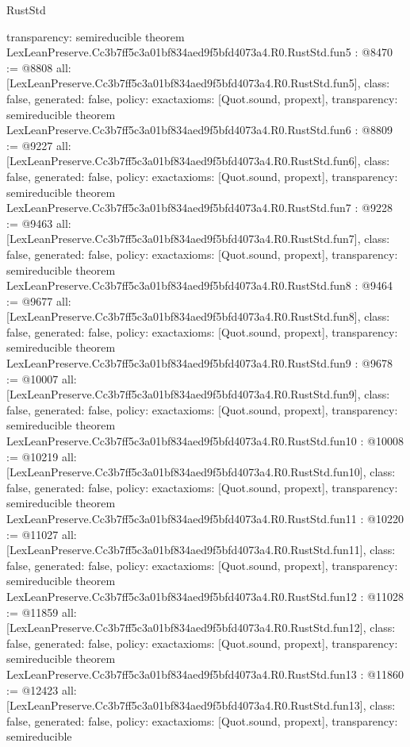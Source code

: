 \begin{lexlean}{RustStd}
\begin{coremodule}
{  transparency: semireducible
}
theorem LexLeanPreserve.Cc3b7ff5c3a01bf834aed9f5bfd4073a4.R0.RustStd.fun5 : @8470 := @8808 {
  all: [LexLeanPreserve.Cc3b7ff5c3a01bf834aed9f5bfd4073a4.R0.RustStd.fun5],
  class: false,
  generated: false,
  policy: exact{axioms: [Quot.sound, propext]},
  transparency: semireducible
}
theorem LexLeanPreserve.Cc3b7ff5c3a01bf834aed9f5bfd4073a4.R0.RustStd.fun6 : @8809 := @9227 {
  all: [LexLeanPreserve.Cc3b7ff5c3a01bf834aed9f5bfd4073a4.R0.RustStd.fun6],
  class: false,
  generated: false,
  policy: exact{axioms: [Quot.sound, propext]},
  transparency: semireducible
}
theorem LexLeanPreserve.Cc3b7ff5c3a01bf834aed9f5bfd4073a4.R0.RustStd.fun7 : @9228 := @9463 {
  all: [LexLeanPreserve.Cc3b7ff5c3a01bf834aed9f5bfd4073a4.R0.RustStd.fun7],
  class: false,
  generated: false,
  policy: exact{axioms: [Quot.sound, propext]},
  transparency: semireducible
}
theorem LexLeanPreserve.Cc3b7ff5c3a01bf834aed9f5bfd4073a4.R0.RustStd.fun8 : @9464 := @9677 {
  all: [LexLeanPreserve.Cc3b7ff5c3a01bf834aed9f5bfd4073a4.R0.RustStd.fun8],
  class: false,
  generated: false,
  policy: exact{axioms: [Quot.sound, propext]},
  transparency: semireducible
}
theorem LexLeanPreserve.Cc3b7ff5c3a01bf834aed9f5bfd4073a4.R0.RustStd.fun9 : @9678 := @10007 {
  all: [LexLeanPreserve.Cc3b7ff5c3a01bf834aed9f5bfd4073a4.R0.RustStd.fun9],
  class: false,
  generated: false,
  policy: exact{axioms: [Quot.sound, propext]},
  transparency: semireducible
}
theorem LexLeanPreserve.Cc3b7ff5c3a01bf834aed9f5bfd4073a4.R0.RustStd.fun10 : @10008 := @10219 {
  all: [LexLeanPreserve.Cc3b7ff5c3a01bf834aed9f5bfd4073a4.R0.RustStd.fun10],
  class: false,
  generated: false,
  policy: exact{axioms: [Quot.sound, propext]},
  transparency: semireducible
}
theorem LexLeanPreserve.Cc3b7ff5c3a01bf834aed9f5bfd4073a4.R0.RustStd.fun11 : @10220 := @11027 {
  all: [LexLeanPreserve.Cc3b7ff5c3a01bf834aed9f5bfd4073a4.R0.RustStd.fun11],
  class: false,
  generated: false,
  policy: exact{axioms: [Quot.sound, propext]},
  transparency: semireducible
}
theorem LexLeanPreserve.Cc3b7ff5c3a01bf834aed9f5bfd4073a4.R0.RustStd.fun12 : @11028 := @11859 {
  all: [LexLeanPreserve.Cc3b7ff5c3a01bf834aed9f5bfd4073a4.R0.RustStd.fun12],
  class: false,
  generated: false,
  policy: exact{axioms: [Quot.sound, propext]},
  transparency: semireducible
}
theorem LexLeanPreserve.Cc3b7ff5c3a01bf834aed9f5bfd4073a4.R0.RustStd.fun13 : @11860 := @12423 {
  all: [LexLeanPreserve.Cc3b7ff5c3a01bf834aed9f5bfd4073a4.R0.RustStd.fun13],
  class: false,
  generated: false,
  policy: exact{axioms: [Quot.sound, propext]},
  transparency: semireducible
}
\end{coremodule}
\end{lexlean}
